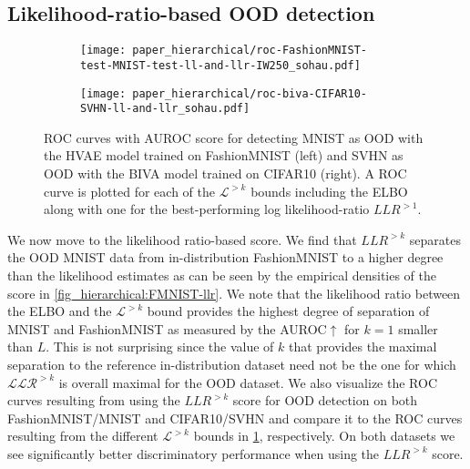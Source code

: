 {\subsection{Likelihood-ratio-based OOD detection}
\begin{figure}[t]
    \centering
    \begin{subfigure}[l]{0.495\columnwidth}
        \texttt{[image: paper\_hierarchical/roc-FashionMNIST-test-MNIST-test-ll-and-llr-IW250\_sohau.pdf]}
    \end{subfigure}
    \hfill
    \begin{subfigure}[r]{0.495\columnwidth}
        \texttt{[image: paper\_hierarchical/roc-biva-CIFAR10-SVHN-ll-and-llr\_sohau.pdf]}
    \end{subfigure}
    \caption[ROC curves for out of distribution detection (MNIST/FashionMNIST and SVHN/CIFAR10).]{%
        ROC curves with AUROC score for detecting MNIST as OOD with the HVAE model trained on FashionMNIST (left) and SVHN as OOD with the BIVA model trained on CIFAR10 (right). 
        A ROC curve is plotted for each of the $\mathcal{L}^{>k}$ bounds including the ELBO along with one for the best-performing log likelihood-ratio $LLR^{>1}$.
    }
    \label{fig_hierarchical:FMNIST-roc-llr and CIFAR10-roc-llr}
\end{figure}
We now move to the likelihood ratio-based score.
We find that $LLR^{>k}$ separates the OOD MNIST data from in-distribution FashionMNIST to a higher degree than the likelihood estimates as can be seen by the empirical densities of the score in \cref{fig_hierarchical:FMNIST-llr}.
We note that the likelihood ratio between the ELBO and the $\mathcal{L}^{>k}$ bound provides the highest degree of separation of MNIST and FashionMNIST as measured by the AUROC$\uparrow$ for $k=1$ smaller than $L$.
This is not surprising since the value of $k$ that provides the maximal separation to the reference in-distribution dataset need not be the one for which $\mathcal{LLR}^{>k}$ is overall maximal for the OOD dataset.
We also visualize the ROC curves resulting from using the $LLR^{>k}$ score for OOD detection on both FashionMNIST/MNIST and CIFAR10/SVHN and compare it to the ROC curves resulting from the different $\mathcal{L}^{>k}$ bounds in \cref{fig_hierarchical:FMNIST-roc-llr and CIFAR10-roc-llr}, respectively.
On both datasets we see significantly better discriminatory performance when using the $LLR^{>k}$ score.

}
